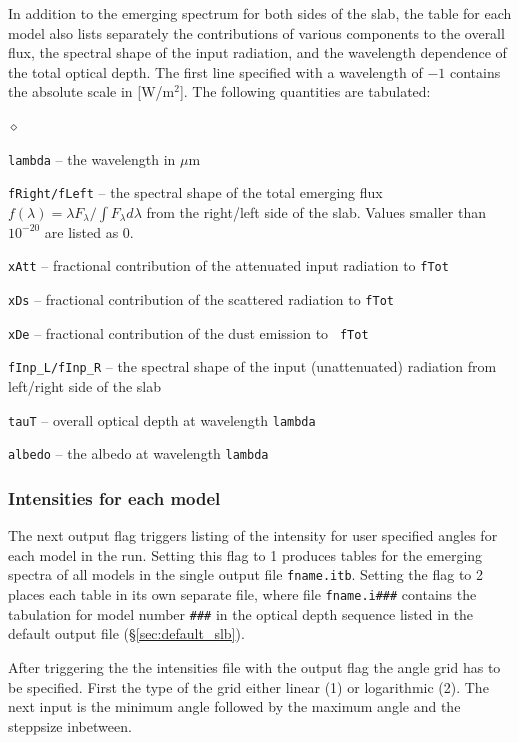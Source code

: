 \documentclass[11pt]{article}
\def\E#1{\hbox{$10^{#1}$}}
\def\mic    {\hbox{$\mu$m}}
\begin{document}
In addition to the emerging spectrum for both sides of the slab, the
table for each model also lists separately the contributions of
various components to the overall flux, the spectral shape of the
input radiation, and the wavelength dependence of the total optical
depth. The first line specified with a wavelength of $-1$ contains the
absolute scale in [W/m$^2$]. The following quantities are tabulated:
\begin{list}{$\diamond$}{}
\item {\tt lambda} -- the wavelength in \mic
\item {\tt fRight/fLeft} -- the spectral shape of the total emerging
  flux $f(\lambda) = \lambda F_\lambda/\int\!F_\lambda d\lambda$ from
  the right/left side of the slab.  Values smaller than \E{-20} are
  listed as 0.
\item{\tt xAtt} -- fractional contribution of the attenuated input
  radiation to {\tt fTot}
\item{\tt xDs} -- fractional contribution of the scattered radiation
  to {\tt fTot}
\item{\tt xDe} -- fractional contribution of the dust emission to {\tt
    fTot}
\item{\tt fInp\_L/fInp\_R} -- the spectral shape of the input
  (unattenuated) radiation from left/right side of the slab
\item{\tt tauT} -- overall optical depth at wavelength {\tt lambda}
\item{\tt albedo} -- the albedo at wavelength {\tt lambda}
\end{list}

\subsubsection{Intensities for each model }
\label{sec:inten_slb}

The next output flag triggers listing of the intensity for user specified
angles for each model in the run.  Setting this flag to 1 produces tables for
the emerging spectra of all models in the single output file {\tt fname.itb}.
Setting the flag to 2 places each table in its own separate file, where file
{\tt fname.i\#\#\#} contains the tabulation for model number {\tt \#\#\#} in
the optical depth sequence listed in the default output file
(\S\ref{sec:default_slb}).

After triggering the the intensities file with the output flag the
angle grid has to be specified. First the type of the grid either
linear (1) or logarithmic (2). The next input is the minimum angle
followed by the maximum angle and the steppsize inbetween.
\end{document}
